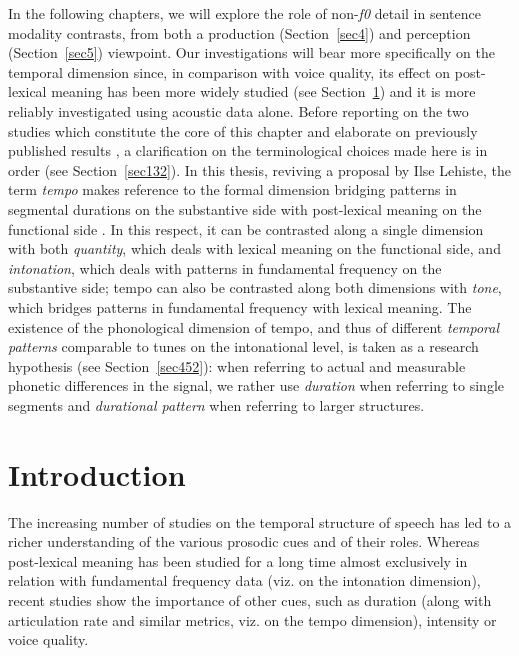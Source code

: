 In the following chapters, we will explore the role of non-\textit{f0} detail in sentence modality contrasts, from both a production (Section~\ref{sec4}) and perception (Section~\ref{sec5}) viewpoint. Our investigations will bear more specifically on the temporal dimension since, in comparison with voice quality, its effect on post-lexical meaning has been more widely studied (see Section~\ref{sec41}) and it is more reliably investigated using acoustic data alone. Before reporting on the two studies which constitute the core of this chapter and elaborate on previously published results \citep{cangemi2011prosodia,cangemi2011local,cangemiFORTHbeyond}, a clarification on the terminological choices made here is in order (see Section~\ref{sec132}). In this thesis, reviving a proposal by Ilse Lehiste, the term \textit{tempo} makes reference to the formal dimension bridging patterns in segmental durations on the substantive side with post-lexical meaning on the functional side \citep{lehiste1970suprasegmentals}. In this respect, it can be contrasted along a single dimension with both \textit{quantity}, which deals with lexical meaning on the functional side, and \textit{intonation}, which deals with patterns in fundamental frequency on the substantive side; tempo can also be contrasted along both dimensions with \textit{tone}, which bridges patterns in fundamental frequency with lexical meaning. The existence of the phonological dimension of tempo, and thus of different \textit{temporal patterns} comparable to tunes on the intonational level, is taken as a research hypothesis (see Section~\ref{sec452}): when referring to actual and measurable phonetic differences in the signal, we rather use \textit{duration} when referring to single segments and \textit{durational pattern} when referring to larger structures.

\section{Introduction}\label{sec41}
The increasing number of studies on the temporal structure of speech has led to a richer understanding of the various prosodic cues and of their roles. Whereas post-lexical meaning has been studied for a long time almost exclusively in relation with fundamental frequency data (viz. on the intonation dimension), recent studies show the importance of other cues, such as duration (along with articulation rate and similar metrics, viz. on the tempo dimension), intensity or voice quality. 

